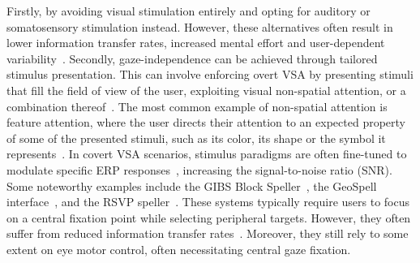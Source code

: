 Firstly, by avoiding visual stimulation entirely and opting for auditory or
somatosensory stimulation instead.
However, these alternatives often result in lower information transfer
rates, increased mental effort and
user-dependent variability~\cite{Reichert2020b}.
Secondly, gaze-independence can be achieved through tailored stimulus presentation.
This can involve enforcing overt VSA by presenting stimuli that fill the field
of view of the user,
exploiting visual non-spatial attention, or a combination thereof~\cite{Treder2011}.
The most common example of non-spatial attention is feature attention, where
the user directs their attention to an expected property of some of the
presented stimuli, such as its color, its shape or the symbol it represents~\cite{Zhang2010,Hwang2015,Reichert2020a}.
In covert VSA scenarios, stimulus paradigms are often fine-tuned to modulate
specific ERP responses~\cite{Schaeff2012,Xu2022}, increasing the
signal-to-noise ratio (SNR).
Some noteworthy examples include the GIBS Block Speller~\cite{Pires2011},
the GeoSpell interface~\cite{Aloise2012a}, and the RSVP
speller~\cite{Acqualagna2011,Lees2018}.
These systems typically require users to focus on a central fixation point while
selecting peripheral targets.
However, they often suffer from reduced information
transfer rates~\cite{Chennu2013}.
Moreover, they still rely to some extent on
eye motor control, often necessitating central gaze fixation.

